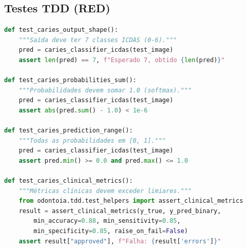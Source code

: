 
\subsection{Testes TDD (RED)}

\begin{lstlisting}[language=Python, caption=Projeto 1 — Testes RED para classificador de cáries]
def test_caries_output_shape():
    """Saída deve ter 7 classes ICDAS (0-6)."""
    pred = caries_classifier_icdas(test_image)
    assert len(pred) == 7, f"Esperado 7, obtido {len(pred)}"

def test_caries_probabilities_sum():
    """Probabilidades devem somar 1.0 (softmax)."""
    pred = caries_classifier_icdas(test_image)
    assert abs(pred.sum() - 1.0) < 1e-6

def test_caries_prediction_range():
    """Todas as probabilidades em [0, 1]."""
    pred = caries_classifier_icdas(test_image)
    assert pred.min() >= 0.0 and pred.max() <= 1.0

def test_caries_clinical_metrics():
    """Métricas clínicas devem exceder limiares."""
    from odontoia.tdd.test_helpers import assert_clinical_metrics
    result = assert_clinical_metrics(y_true, y_pred_binary,
        min_accuracy=0.88, min_sensitivity=0.85,
        min_specificity=0.85, raise_on_fail=False)
    assert result["approved"], f"Falha: {result['errors']}"
\end{lstlisting}



